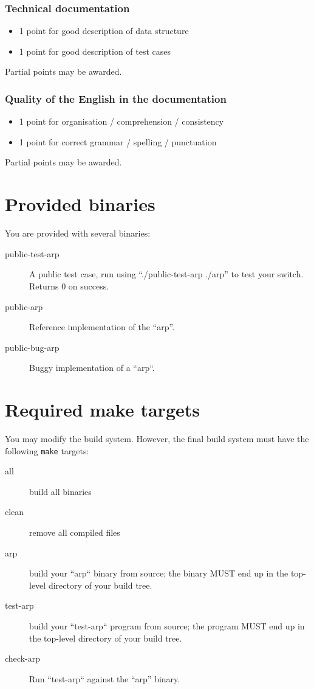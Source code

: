 \documentclass{article}
\begin{document}
\subsubsection{Technical documentation}
\begin{itemize}
\item 1 point for good description of data structure
\item 1 point for good description of test cases
\end{itemize}
Partial points may be awarded.

\subsubsection{Quality of the English in the documentation}

\begin{itemize}
\item 1 point for organisation / comprehension / consistency
\item 1 point for correct grammar / spelling / punctuation
\end{itemize}
Partial points may be awarded.



\section{Provided binaries} \label{sec:binaries}

You are provided with several binaries:
\begin{description}
\item[public-test-arp] A public test case, run using ``./public-test-arp ./arp''
  to test your switch. Returns 0 on success.
\item[public-arp] Reference implementation of the ``arp''.
\item[public-bug-arp] Buggy implementation of a ``arp``.
\end{description}


\section{Required make targets}

You may modify the build system. However, the final build system must
have the following {\tt make} targets:

\begin{description}
\item[all] build all binaries
\item[clean] remove all compiled files
\item[arp] build your ``arp`` binary from source; the binary MUST end up in the top-level directory of your build tree.
\item[test-arp] build your ``test-arp`` program from source; the program MUST end up in the top-level directory of your build tree.
\item[check-arp] Run ``test-arp`` against the ``arp'' binary.
\end{description}
\end{document}
